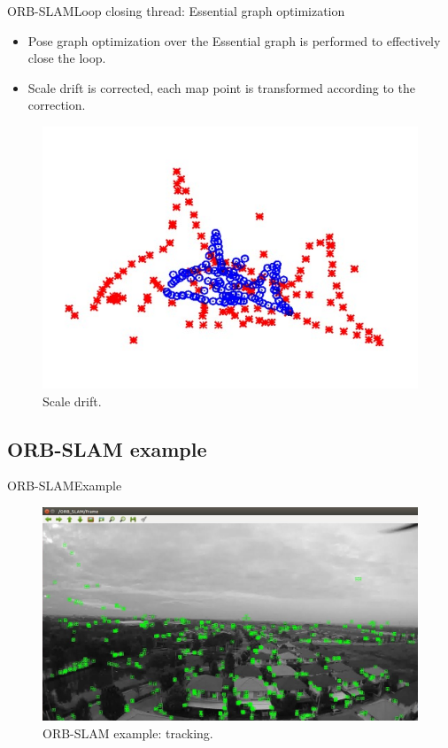 \documentclass{beamer}
\begin{document}
\begin{frame}{ORB-SLAM}{Loop closing thread: Essential graph optimization}
  \begin{itemize}
      \item{
      Pose graph optimization over the Essential graph is performed to effectively close the loop.
      }
      \item{
      Scale drift is corrected, each map point is transformed according to the correction.
      }
  \end{itemize}
  
  \begin{figure}
\includegraphics[scale=0.3]{Figure/scaleDrift}
\caption{Scale drift.}
\end{figure}
  
\end{frame}


\subsection{ORB-SLAM example}
\begin{frame}{ORB-SLAM}{Example}
  \begin{figure}
\includegraphics[scale=0.3]{Figure/ORBtrack}
\caption{ORB-SLAM example: tracking.}
\end{figure}
\end{frame}
\end{document}

